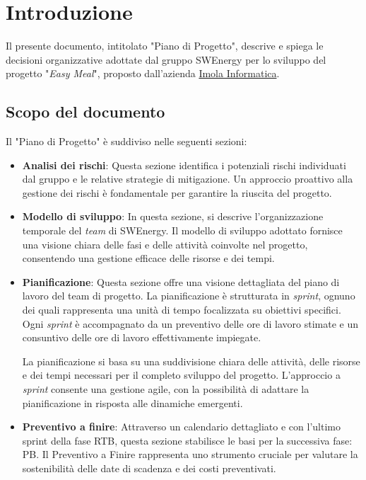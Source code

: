 \section{Introduzione}

Il presente documento, intitolato "Piano di Progetto", descrive e spiega le
decisioni organizzative adottate dal gruppo SWEnergy per lo sviluppo del
progetto "\textit{Easy Meal}", proposto dall'azienda
\href{https://imolainformatica.it/}{Imola Informatica}.

\subsection{Scopo del documento}

Il "Piano di Progetto" è suddiviso nelle seguenti sezioni:

\begin{itemize}
	\item \textbf{Analisi dei rischi}: Questa sezione identifica i potenziali 
		rischi individuati dal gruppo e le relative strategie di mitigazione. 
		Un approccio proattivo alla gestione dei rischi è fondamentale 
		per garantire la riuscita del progetto.

	\item \textbf{Modello di sviluppo}: In questa sezione, si descrive 
		l'organizzazione temporale del \textit{team} di SWEnergy. 
		Il modello di sviluppo adottato fornisce una visione chiara delle fasi 
		e delle attività coinvolte nel progetto, consentendo una gestione 
		efficace delle risorse e dei tempi.

	\item \textbf{Pianificazione}: Questa sezione offre una visione dettagliata 
		del piano di lavoro del team di progetto. 
		La pianificazione è strutturata in \textit{sprint}, ognuno dei quali 
		rappresenta una unità di tempo focalizzata su obiettivi specifici. 
		Ogni \textit{sprint} è accompagnato da un preventivo delle ore di lavoro stimate 
		e un consuntivo delle ore di lavoro effettivamente impiegate.

		La pianificazione si basa su una suddivisione chiara delle attività, delle risorse 
		e dei tempi necessari per il completo sviluppo del progetto. 
		L'approccio a \textit{sprint} consente una gestione agile, con la possibilità di 
		adattare la pianificazione in risposta alle dinamiche emergenti.

	\item \textbf{Preventivo a finire}: Attraverso un calendario dettagliato e con l'ultimo 
		sprint della fase RTB, questa sezione stabilisce le basi per la successiva fase: PB. 
		Il Preventivo a Finire rappresenta uno strumento cruciale per valutare 
		la sostenibilità delle date di scadenza e dei costi preventivati.


\end{itemize}
